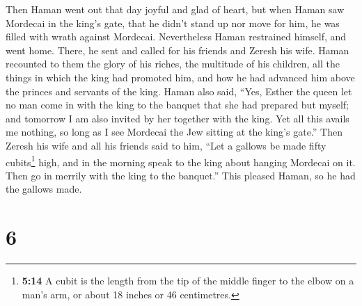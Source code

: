  Then Haman went out that day joyful and glad of heart,
but when Haman saw Mordecai in the king's gate, that he didn't stand up
nor move for him, he was filled with wrath against Mordecai.
 Nevertheless Haman restrained himself, and went home.
There, he sent and called for his friends and Zeresh his wife.
 Haman recounted to them the glory of his riches, the
multitude of his children, all the things in which the king had promoted
him, and how he had advanced him above the princes and servants of the
king.  Haman also said, ``Yes, Esther the queen let no
man come in with the king to the banquet that she had prepared but
myself; and tomorrow I am also invited by her together with the king.
 Yet all this avails me nothing, so long as I see
Mordecai the Jew sitting at the king's gate.''  Then
Zeresh his wife and all his friends said to him, ``Let a gallows be made
fifty cubits\footnote{\textbf{5:14} A cubit is the length from the tip
  of the middle finger to the elbow on a man's arm, or about 18 inches
  or 46 centimetres.} high, and in the morning speak to the king about
hanging Mordecai on it. Then go in merrily with the king to the
banquet.'' This pleased Haman, so he had the gallows made.

\hypertarget{section-5}{%
\section{6}\label{section-5}}


